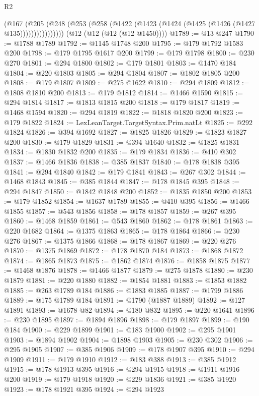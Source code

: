\begin{lexlean}{R2}
\begin{coremodule}
              (@167
                (@205
                  (@248 (@253 (@258 (@1422 (@1423 (@1424 (@1425 (@1426 (@1427 @135))))))))))))))))
    (@12 (@12 (@12 (@12 @1450))))
@1789 := @13 @247
@1790 := @1788 @1789
@1792 := @1145 @1748 @200
@1795 := @179 @1792 @1583 @200
@1798 := @179 @1795 @1617 @200
@1799 := @179 @1798
@1800 := @230 @270
@1801 := @294 @1800
@1802 := @179 @1801
@1803 := @1470 @184
@1804 := @220 @1803
@1805 := @294 @1804
@1807 := @1802 @1805 @200
@1808 := @179 @1807
@1809 := @275 @1622
@1810 := @294 @1809
@1812 := @1808 @1810 @200
@1813 := @179 @1812
@1814 := @1466 @1590
@1815 := @294 @1814
@1817 := @1813 @1815 @200
@1818 := @179 @1817
@1819 := @1468 @1594
@1820 := @294 @1819
@1822 := @1818 @1820 @200
@1823 := @179 @1822
@1824 := LexLeanTarget.TargetSyntax.Prim.natLt
@1825 := @292 @1824
@1826 := @394 @1692
@1827 := @1825 @1826
@1829 := @1823 @1827 @200
@1830 := @179 @1829
@1831 := @394 @1640
@1832 := @1825 @1831
@1834 := @1830 @1832 @200
@1835 := @179 @1834
@1836 := @410 @302
@1837 := @1466 @1836
@1838 := @385 @1837
@1840 := @178 @1838 @395
@1841 := @294 @1840
@1842 := @179 @1841
@1843 := @267 @302
@1844 := @1468 @1843
@1845 := @385 @1844
@1847 := @178 @1845 @395
@1848 := @294 @1847
@1850 := @1842 @1848 @200
@1852 := @1835 @1850 @200
@1853 := @179 @1852
@1854 := @1637 @1789
@1855 := @410 @395
@1856 := @1466 @1855
@1857 := @543 @1856
@1858 := @178 @1857
@1859 := @267 @395
@1860 := @1468 @1859
@1861 := @543 @1860
@1862 := @178 @1861
@1863 := @220 @1682
@1864 := @1375 @1863
@1865 := @178 @1864
@1866 := @230 @276
@1867 := @1375 @1866
@1868 := @178 @1867
@1869 := @220 @276
@1870 := @1375 @1869
@1872 := @178 @1870 @184
@1873 := @1868 @1872
@1874 := @1865 @1873
@1875 := @1862 @1874
@1876 := @1858 @1875
@1877 := @1468 @1876
@1878 := @1466 @1877
@1879 := @275 @1878
@1880 := @230 @1879
@1881 := @220 @1880
@1882 := @1854 @1881
@1883 := @1853 @1882
@1885 := @263 @1789 @184
@1886 := @1883 @1885
@1887 := @1799 @1886
@1889 := @175 @1789 @184
@1891 := @1790 (@1887 @1889)
@1892 := @127 @1891
@1893 := @1678 @82
@1894 := @180 @832
@1895 := @220 @1641
@1896 := @230 @1895
@1897 := @1894 @1896
@1898 := @179 @1897
@1899 := @190 @184
@1900 := @229 @1899
@1901 := @183 @1900
@1902 := @295 @1901
@1903 := @1894 @1902
@1904 := @1898 @1903
@1905 := @230 @302
@1906 := @295 @1905
@1907 := @385 @1906
@1909 := @178 @1907 @395
@1910 := @294 @1909
@1911 := @179 @1910
@1912 := @183 @388
@1913 := @385 @1912
@1915 := @178 @1913 @395
@1916 := @294 @1915
@1918 := @1911 @1916 @200
@1919 := @179 @1918
@1920 := @229 @1836
@1921 := @385 @1920
@1923 := @178 @1921 @395
@1924 := @294 @1923

\end{coremodule}
\end{lexlean}
